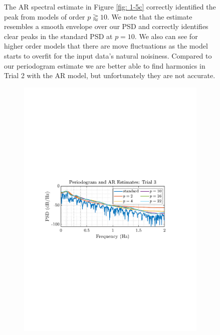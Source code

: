 \documentclass[12pt]{article}
\numberwithin{equation}{section}
\begin{document}
\begin{figure}[H]
			\begin{minipage}{0.46\textwidth}
				The AR spectral estimate in Figure \ref{fig: 1-5c} correctly identified the peak from models of order $p\gtrapprox10$. We note that the estimate resembles a smooth envelope over our PSD and correctly identifies clear peaks in the standard PSD at $p=10$. We also can see for higher order models that there are move fluctuations as the model starts to overfit for the input data's natural noisiness. Compared to our periodogram estimate we are better able to find harmonics in Trial 2 with the AR model, but unfortunately they are not accurate.
			\end{minipage}%
			\begin{minipage}{0.04\textwidth}
				\hspace*{0.04\textwidth}
			\end{minipage}%
			\begin{minipage}{0.49\textwidth}
				\begin{subfigure}{\textwidth}
					\includegraphics[trim={2.2cm 11.2cm 3.15cm  11.2cm}, clip, width=\textwidth]{../MATLAB/figures/q1_5c_fig03.pdf} 

\end{subfigure}
\end{minipage}
\end{figure}
\end{document}
